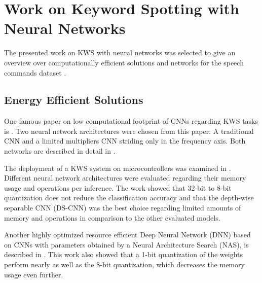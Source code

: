 
\section{Work on Keyword Spotting with Neural Networks}\label{sec:prev_kws}
The presented work on KWS with neural networks was selected to give an overview over computationally efficient solutions and networks for the speech commands dataset \cite{Warden2018SpeechCommands}.



\subsection{Energy Efficient Solutions}
One famous paper on low computational footprint of CNNs regarding KWS tasks is \cite{Sainath2015KWS}.
Two neural network architectures were chosen from this paper: A traditional CNN and a limited multipliers CNN striding only in the frequency axis.
Both networks are described in detail in .

The deployment of a KWS system on microcontrollers was examined in \cite{Zhang2017HelloEdge}.
Different neural network architectures were evaluated regarding their memory usage and operations per inference.
The work showed that 32-bit to 8-bit quantization does not reduce the classification accuracy and that the depth-wise separable CNN (DS-CNN) was the best choice regarding limited amounts of memory and operations in comparison to the other evaluated models.

Another highly optimized resource efficient Deep Neural Network (DNN) based on CNNs with parameters obtained by a Neural Architecture Search (NAS), is described in \cite{Peter2020ResourceEffDNN}.
This work also showed that a 1-bit quantization of the weights perform nearly as well as the 8-bit quantization, which decreases the memory usage even further.



